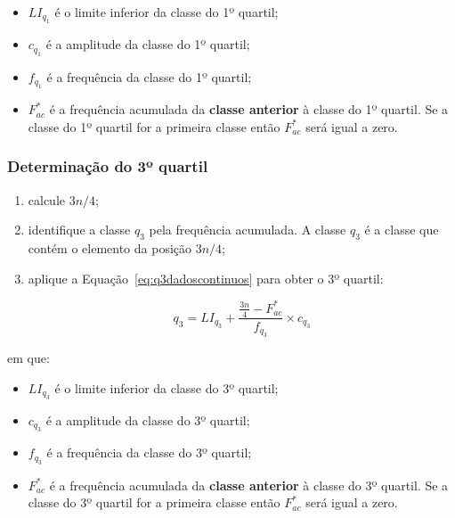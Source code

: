 \documentclass[11pt,fleqn]{book} %
\begin{document}
\begin{itemize}
\item $LI_{q_1}$ é o limite inferior da classe do 1º quartil;
\item $c_{q_1}$ é a amplitude da classe do 1º quartil;
\item $f_{q_1}$ é a frequência da classe do 1º quartil;
\item $F_{ac}^*$ é a frequência acumulada da {\bf classe anterior} à classe do 1º quartil. Se a classe do 1º quartil for a primeira classe então $F_{ac}^*$ será igual a zero. \\
\end{itemize}



\subsubsection{Determinação do 3º quartil}
\vspace{0,3cm}

\begin{enumerate}

\item calcule $3n/4$;
\item identifique a classe $q_3$ pela frequência acumulada. A classe $q_3$ é a classe que contém o elemento da posição $3n/4$;
\item aplique a Equação~\ref{eq:q3dadoscontinuos} para obter o 3º quartil:

\begin{eBox}
\vspace{-0.5cm}
\begin{equation} \label{eq:q3dadoscontinuos}
	q_3=LI_{q_3}+\frac{\frac{3n}{4}-F_{ac}^*}{f_{q_3}} \times c_{q_3}
\end{equation}
\end{eBox}

\end{enumerate}

\noindent em que:

\begin{itemize}
\item $LI_{q_3}$ é o limite inferior da classe do 3º quartil;
\item $c_{q_3}$ é a amplitude da classe do 3º quartil;
\item $f_{q_3}$ é a frequência da classe do 3º quartil;
\item $F_{ac}^*$ é a frequência acumulada da {\bf classe anterior} à classe do 3º quartil. Se a classe do 3º quartil for a primeira classe então $F_{ac}^*$ será igual a zero. \\
\end{itemize}
\end{document}
